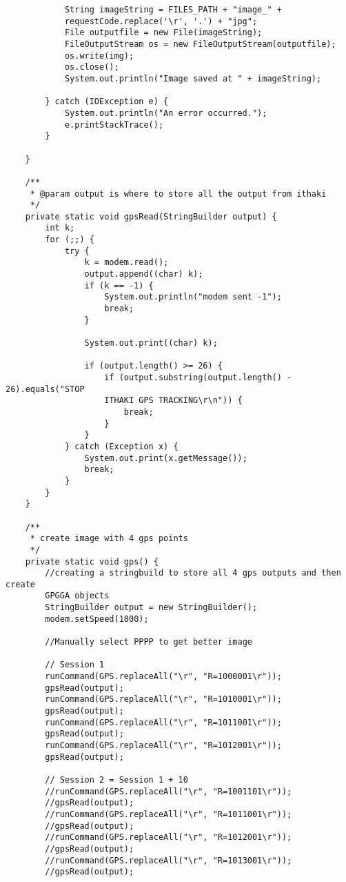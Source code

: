 \documentclass{article}
\begin{document}
\begin{verbatim}
            String imageString = FILES_PATH + "image_" +
            requestCode.replace('\r', '.') + "jpg";
            File outputfile = new File(imageString);
            FileOutputStream os = new FileOutputStream(outputfile);
            os.write(img);
            os.close();
            System.out.println("Image saved at " + imageString);

        } catch (IOException e) {
            System.out.println("An error occurred.");
            e.printStackTrace();
        }

    }

    /**
     * @param output is where to store all the output from ithaki
     */
    private static void gpsRead(StringBuilder output) {
        int k;
        for (;;) {
            try {
                k = modem.read();
                output.append((char) k);
                if (k == -1) {
                    System.out.println("modem sent -1");
                    break;
                }

                System.out.print((char) k);

                if (output.length() >= 26) {
                    if (output.substring(output.length() - 26).equals("STOP
                    ITHAKI GPS TRACKING\r\n")) {
                        break;
                    }
                }
            } catch (Exception x) {
                System.out.print(x.getMessage());
                break;
            }
        }
    }

    /**
     * create image with 4 gps points
     */
    private static void gps() {
        //creating a stringbuild to store all 4 gps outputs and then create
        GPGGA objects
        StringBuilder output = new StringBuilder();
        modem.setSpeed(1000);

        //Manually select PPPP to get better image

        // Session 1
        runCommand(GPS.replaceAll("\r", "R=1000001\r"));
        gpsRead(output);
        runCommand(GPS.replaceAll("\r", "R=1010001\r"));
        gpsRead(output);
        runCommand(GPS.replaceAll("\r", "R=1011001\r"));
        gpsRead(output);
        runCommand(GPS.replaceAll("\r", "R=1012001\r"));
        gpsRead(output);

        // Session 2 = Session 1 + 10
        //runCommand(GPS.replaceAll("\r", "R=1001101\r"));
        //gpsRead(output);
        //runCommand(GPS.replaceAll("\r", "R=1011001\r"));
        //gpsRead(output);
        //runCommand(GPS.replaceAll("\r", "R=1012001\r"));
        //gpsRead(output);
        //runCommand(GPS.replaceAll("\r", "R=1013001\r"));
        //gpsRead(output);


\end{verbatim}
\end{document}
